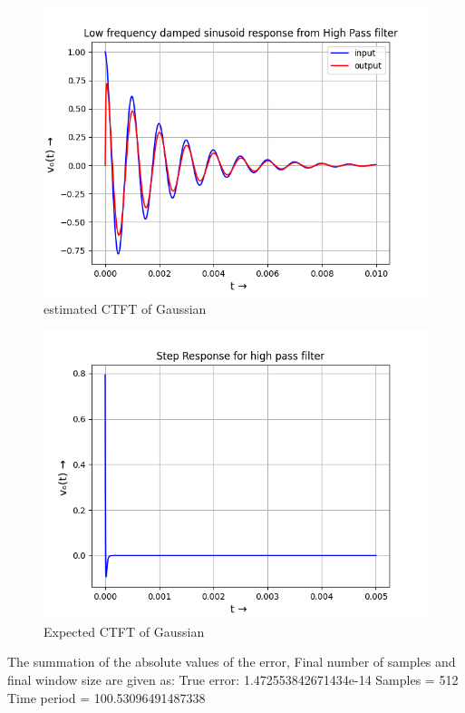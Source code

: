 \documentclass{article}
\begin{document}
\begin{figure}[h!]
\centering
\includegraphics[scale=0.6]{Figure_5.png}
\caption{estimated CTFT of Gaussian}
\label{fig:universe}
\end{figure}

\begin{figure}[h!]
\centering
\includegraphics[scale=0.6]{Figure_6.png}
\caption{Expected CTFT of Gaussian}
\label{fig:universe}
\end{figure}
The summation of the absolute values of the error, Final number of samples and final window size are given as:\newline
True error: 1.472553842671434e-14\newline
Samples = 512\newline 
Time period = 100.53096491487338\newline
\end{document}
